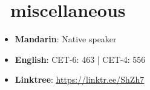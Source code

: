 \documentclass{common}
\begin{document}
\vspace{0.85ex}

\section{\faInfo\ miscellaneous}
\begin{itemize}[parsep=0.5ex]
    \item \textbf{Mandarin}: Native speaker
    \item \textbf{English}: CET-6: 463 | CET-4: 556
    \item \textbf{Linktree}: \href{https://linktr.ee/ShZh7}{\underline{https://linktr.ee/ShZh7}}
\end{itemize}
\end{document}
